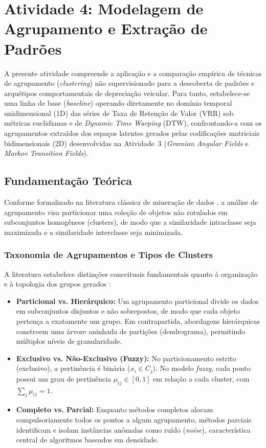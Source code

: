 \section{Atividade 4: Modelagem de Agrupamento e Extração de Padrões}

A presente atividade compreende a aplicação e a comparação empírica de técnicas de agrupamento (\textit{clustering}) não supervisionado para a descoberta de padrões e arquétipos comportamentais de depreciação veicular. Para tanto, estabelece-se uma linha de base (\textit{baseline}) operando diretamente no domínio temporal unidimensional (1D) das séries de Taxa de Retenção de Valor (VRR) sob métricas euclidianas e de \textit{Dynamic Time Warping} (DTW), confrontando-a com os agrupamentos extraídos dos espaços latentes gerados pelas codificações matriciais bidimensionais (2D) desenvolvidas na Atividade~3 (\textit{Gramian Angular Fields} e \textit{Markov Transition Fields}).

\subsection{Fundamentação Teórica}

Conforme formalizado na literatura clássica de mineração de dados \cite{tan2019introduction}, a análise de agrupamento visa particionar uma coleção de objetos não rotulados em subconjuntos homogêneos (clusters), de modo que a similaridade intraclasse seja maximizada e a similaridade interclasse seja minimizada.

\subsubsection{Taxonomia de Agrupamentos e Tipos de Clusters}

A literatura estabelece distinções conceituais fundamentais quanto à organização e à topologia dos grupos gerados \cite{tan2019introduction}:
\begin{itemize}
    \item \textbf{Particional vs. Hierárquico:} Um agrupamento particional divide os dados em subconjuntos disjuntos e não sobrepostos, de modo que cada objeto pertença a exatamente um grupo. Em contrapartida, abordagens hierárquicas constroem uma árvore aninhada de partições (dendrograma), permitindo múltiplos níveis de granularidade.
    \item \textbf{Exclusivo vs. Não-Exclusivo (Fuzzy):} No particionamento estrito (exclusivo), a pertinência é binária ($x_i \in C_j$). No modelo \textit{fuzzy}, cada ponto possui um grau de pertinência $\mu_{ij} \in [0, 1]$ em relação a cada cluster, com $\sum_j \mu_{ij} = 1$.
    \item \textbf{Completo vs. Parcial:} Enquanto métodos completos alocam compulsoriamente todos os pontos a algum agrupamento, métodos parciais identificam e isolam instâncias anômalas como ruído (\textit{noise}), característica central de algoritmos baseados em densidade.
\end{itemize}

